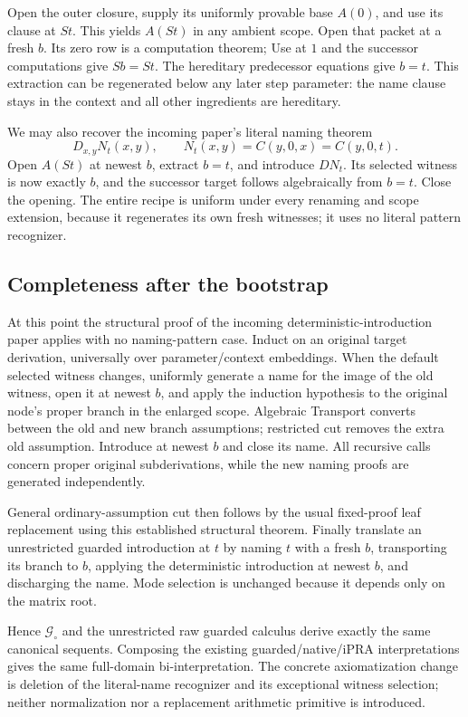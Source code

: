 Open the outer closure, supply its uniformly provable base $A(0)$, and
use its clause at $St$.  This yields $A(St)$ in any ambient scope.
Open that packet at a fresh $b$.  Its zero row is a computation theorem;
Use at $1$ and the successor computations give $Sb=St$.  The
hereditary predecessor equations give $b=t$.  This extraction can be
regenerated below any later step parameter: the name clause stays in
the context and all other ingredients are hereditary.

We may also recover the incoming paper's literal naming theorem
\[
 D_{x,y}N_t(x,y),\qquad N_t(x,y)=C(y,0,x)=C(y,0,t).
\]
Open $A(St)$ at newest $b$, extract $b=t$, and introduce $D N_t$.
Its selected witness is now exactly $b$, and the successor target follows
algebraically from $b=t$.  Close the opening.  The entire recipe is
uniform under every renaming and scope extension, because it regenerates
its own fresh witnesses; it uses no literal pattern recognizer.

\subsection{Completeness after the bootstrap}

At this point the structural proof of the incoming deterministic-introduction
paper applies with no naming-pattern case.  Induct on an original target
derivation, universally over parameter/context embeddings.  When the
default selected witness changes, uniformly generate a name for the image
of the old witness, open it at newest $b$, and apply the induction
hypothesis to the original node's proper branch in the enlarged scope.
Algebraic Transport converts between the old and new branch assumptions;
restricted cut removes the extra old assumption.  Introduce at newest $b$
and close its name.  All recursive calls concern proper original
subderivations, while the new naming proofs are generated independently.

General ordinary-assumption cut then follows by the usual fixed-proof leaf
replacement using this established structural theorem.  Finally translate
an unrestricted guarded introduction at $t$ by naming $t$ with a fresh
$b$, transporting its branch to $b$, applying the deterministic
introduction at newest $b$, and discharging the name.  Mode selection is
unchanged because it depends only on the matrix root.

Hence $\mathcal G_\circ$ and the unrestricted raw guarded calculus
derive exactly the same canonical sequents.  Composing the existing
guarded/native/iPRA interpretations gives the same full-domain
bi-interpretation.  The concrete axiomatization change is deletion of the
literal-name recognizer and its exceptional witness selection; neither
normalization nor a replacement arithmetic primitive is introduced.
